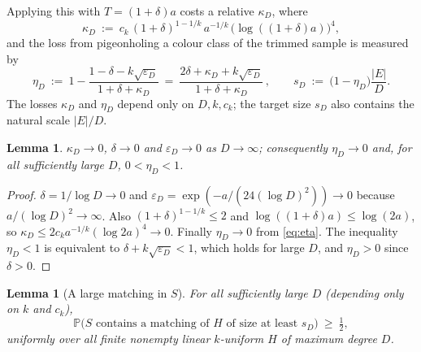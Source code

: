 \documentclass[11pt,a4paper]{amsart}
\theoremstyle{plain}
\newtheorem{lemma}[theorem]{Lemma}
\theoremstyle{definition}
\theoremstyle{remark}
\newcommand{\EE}{E}
\newcommand{\PP}{\mathbb{P}}
\begin{document}
Applying this with $T=(1+\delta)a$ costs a relative $\kappa_D$, where
\begin{equation}
\label{eq:kappa}
  \kappa_D\ :=\ c_k\,(1+\delta)^{1-1/k}\,a^{-1/k}\,\bigl(\log((1+\delta)a)\bigr)^4 ,
\end{equation}
and the loss from pigeonholing a colour class of the trimmed sample is measured by
\begin{equation}
\label{eq:eta}
  \eta_D\ :=\ 1-\frac{1-\delta-k\sqrt{\varepsilon_D}}{1+\delta+\kappa_D}
  \ =\ \frac{2\delta+\kappa_D+k\sqrt{\varepsilon_D}}{1+\delta+\kappa_D}\,,
  \qquad
  s_D\ :=\ \bigl(1-\eta_D\bigr)\frac{|\EE|}{D} .
\end{equation}
The losses $\kappa_D$ and $\eta_D$ depend only on $D,k,c_k$; the target size $s_D$
also contains the natural scale $|\EE|/D$.

\begin{lemma}
\label{lem:kappa-small}
$\kappa_D\to0$, $\delta\to0$ and $\varepsilon_D\to0$ as $D\to\infty$; consequently
$\eta_D\to0$ and, for all sufficiently large $D$, $0<\eta_D<1$.
\end{lemma}

\begin{proof}
$\delta=1/\log D\to0$ and
$\varepsilon_D=\exp(-a/(24(\log D)^2))\to0$ because
$a/(\log D)^2\to\infty$. Also $(1+\delta)^{1-1/k}\le2$ and
$\log((1+\delta)a)\le\log(2a)$, so
$\kappa_D\le 2c_k a^{-1/k}(\log 2a)^4\to0$. Finally $\eta_D\to0$ from
\eqref{eq:eta}. The inequality $\eta_D<1$ is equivalent to
$\delta+k\sqrt{\varepsilon_D}<1$, which holds for large $D$, and $\eta_D>0$ since
$\delta>0$.
\end{proof}

\begin{lemma}[A large matching in $S$]
\label{lem:largematching}
For all sufficiently large $D$ (depending only on $k$ and $c_k$),
\[
  \PP\bigl(S\text{ contains a matching of }H\text{ of size at least } s_D\bigr)
  \ \ge\ \tfrac12 ,
\]
uniformly over all finite nonempty linear $k$-uniform $H$ of maximum degree $D$.
\end{lemma}
\end{document}
